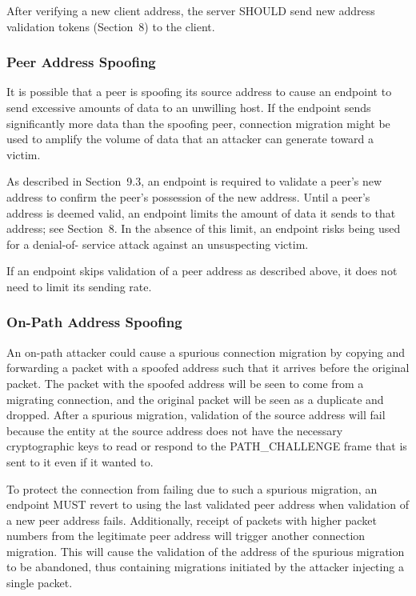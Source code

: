 \documentclass{article}
\begin{document}
After verifying a new client address, the server SHOULD send new address validation tokens (Section~8) to the client.

\subsubsection{Peer Address Spoofing}

It is possible that a peer is spoofing its source address to cause an endpoint to send excessive amounts of data to an unwilling host.  If the endpoint sends significantly more data than the spoofing peer, connection migration might be used to amplify the volume of data that an attacker can generate toward a victim.

As described in Section~9.3, an endpoint is required to validate a peer's new address to confirm the peer's possession of the new address.  Until a peer's address is deemed valid, an endpoint limits the amount of data it sends to that address; see Section~8.  In the absence of this limit, an endpoint risks being used for a denial-of- service attack against an unsuspecting victim.

If an endpoint skips validation of a peer address as described above, it does not need to limit its sending rate.

\subsubsection{On-Path Address Spoofing}

An on-path attacker could cause a spurious connection migration by copying and forwarding a packet with a spoofed address such that it arrives before the original packet.  The packet with the spoofed address will be seen to come from a migrating connection, and the original packet will be seen as a duplicate and dropped.  After a spurious migration, validation of the source address will fail because the entity at the source address does not have the necessary cryptographic keys to read or respond to the PATH\_CHALLENGE frame that is sent to it even if it wanted to.

To protect the connection from failing due to such a spurious migration, an endpoint MUST revert to using the last validated peer address when validation of a new peer address fails.  Additionally, receipt of packets with higher packet numbers from the legitimate peer address will trigger another connection migration.  This will cause the validation of the address of the spurious migration to be abandoned, thus containing migrations initiated by the attacker injecting a single packet.
\end{document}
